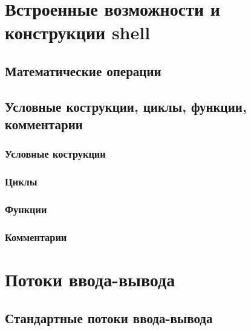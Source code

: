 \documentclass[oneside]{book}
\begin{document}
	\chapter{Встроенные возможности и конструкции shell}
	

		\section{Математические операции}
		
			
		\section{Условные кострукции, циклы, функции, комментарии}
		
		
			\subsection{Условные кострукции}
			
			
			\subsection{Циклы}
			
			
			\subsection{Функции}
			
			
			\subsection{Комментарии}
			
			
		\chapter{Потоки ввода-вывода}
		
		
			\section{Стандартные потоки ввода-вывода}
			
			
\end{document}
